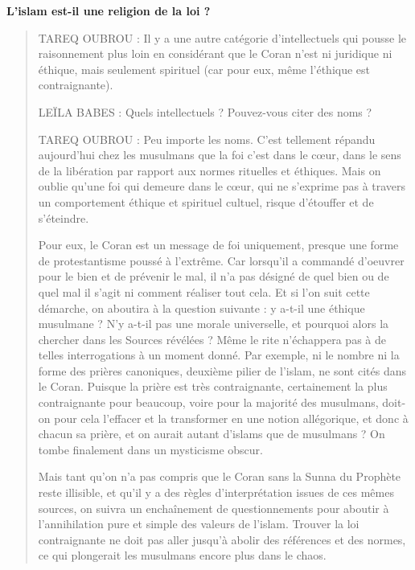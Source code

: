 \textbf{L'islam est-il une religion de la loi ?}
\begin{quote}
TAREQ OUBROU : Il y a une autre catégorie d'intellectuels qui pousse le
raisonnement plus loin en considérant que le Coran n'est ni juridique ni
éthique, mais seulement spirituel (car pour eux, même l'éthique est
contraignante).

LEÏLA BABES : Quels intellectuels ? Pouvez-vous citer des noms ?

TAREQ OUBROU : Peu importe les noms. C'est tellement répandu aujourd'hui
chez les musulmans que la foi c'est dans le cœur, dans le sens de la
libération par rapport aux normes rituelles et éthiques. Mais on oublie
qu'une foi qui demeure dans le cœur, qui ne s'exprime pas à travers un
comportement éthique et spirituel cultuel, risque d'étouffer et de
s'éteindre.


Pour eux, le Coran est un message de foi uniquement, presque une forme
de protestantisme poussé à l'extrême. Car lorsqu'il a commandé d'oeuvrer
pour le bien et de prévenir le mal, il n'a pas désigné de quel bien ou
de quel mal il s'agit ni comment réaliser tout cela. Et si l'on suit
cette démarche, on aboutira à la question suivante : y a-t-il une
éthique musulmane ? N'y a-t-il pas une morale universelle, et pourquoi
alors la chercher dans les Sources révélées ? Même le rite n'échappera
pas à de telles interrogations à un moment donné. Par exemple, ni le
nombre ni la forme des prières canoniques, deuxième pilier de l'islam,
ne sont cités dans le Coran. Puisque la prière est très contraignante,
certainement la plus contraignante pour beaucoup, voire pour la majorité
des musulmans, doit-on pour cela l'effacer et la transformer en une
notion allégorique, et donc à chacun sa prière, et on aurait autant
d'islams que de musulmans ? On tombe finalement dans un mysticisme
obscur.

Mais tant qu'on n'a pas compris que le Coran sans la Sunna du Prophète
reste illisible, et qu'il y a des règles d'interprétation issues de ces
mêmes sources, on suivra un enchaînement de questionnements pour aboutir
à l'annihilation pure et simple des valeurs de l'islam. Trouver la loi
contraignante ne doit pas aller jusqu'à abolir des références et des
normes, ce qui plongerait les musulmans encore plus dans le chaos.


\end{quote}

